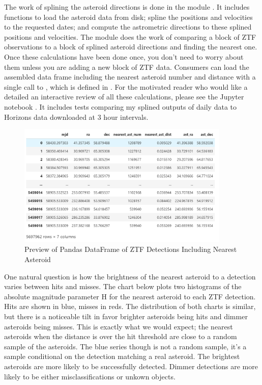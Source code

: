 The work of splining the asteroid directions is done in the module .
It includes functions to load the asteroid data from disk; spline the positions and velocities to the requested dates;
and compute the astrometric directions to these splined positions and velocities.
The module  does the work of comparing a block of ZTF observations to a block of splined asteroid directions and finding the nearest one.
Once these calculations have been done once, you don't need to worry about them unless you are adding a new block of ZTF data.
Consumers can load the assembled data frame including the nearest asteroid number and distance with 
a single call to , which is defined in .
For the motivated reader who would like a detailed an interactive review of all these calculations, please see the Jupyter notebook .
It includes tests comparing my splined outputs of daily data to Horizons data downloaded at 3 hour intervals.

\begin{figure}[hbt!]
\begin{center}
\includegraphics[width=0.9\textwidth]{../figs/ztf/ztf_nearest_ast_dataframe.png}
\caption[Preview of Pandas DataFrame of ZTF Detections Including Nearest Asteroid]
{Preview of Pandas DataFrame of ZTF Detections Including Nearest Asteroid}
\end{center}
\end{figure}

One natural question is how the brightness of the nearest asteroid to a detection varies between hits and misses.
The chart below plots two histograms of the absolute magnitude parameter H for the nearest asteroid to each ZTF detection.
Hits are shown in blue, misses in reds.
The distribution of both charts is similar, but there is a noticeable tilt 
in favor brighter asteroids being hits and dimmer asteroids being misses.
This is exactly what we would expect; 
the nearest asteroids when the distance is over the hit threshold are close to a random sample of the asteroids.
The blue series though is not a random sample, it's a sample conditional on the detection matching a real asteroid.
The brightest asteroids are more likely to be successfully detected.
Dimmer detections are more likely to be either misclassifications or unkown objects.

